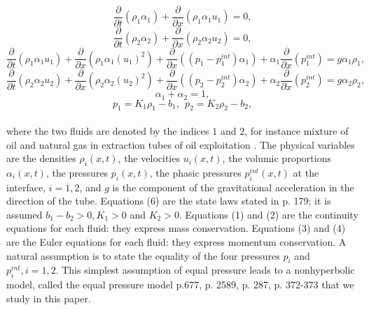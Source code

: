\documentclass[a4paper,12pt]{article}
\begin{document}
\begin{equation}\frac{\partial}{\partial t}(\rho_1 \alpha_1)+\frac{\partial}{\partial x}(\rho_1\alpha_1 u_1)=0,\end{equation}
\begin{equation}\frac{\partial}{\partial t}(\rho_2 \alpha_2)+\frac{\partial}{\partial x}(\rho_2\alpha_2 u_2)=0,\end{equation}
\begin{equation}\frac{\partial}{\partial t}(\rho_1 \alpha_1u_1)+\frac{\partial}{\partial x}(\rho_1\alpha_1( u_1)^2)+\frac{\partial}{\partial x}((p_1-p_1^{int})\alpha_1)+\alpha_1\frac{\partial}{\partial x}(p_1^{int})=g\alpha_1\rho_1,\end{equation}
\begin{equation}\frac{\partial}{\partial t}(\rho_2 \alpha_2u_2)+\frac{\partial}{\partial x}(\rho_2\alpha_2( u_2)^2)+\frac{\partial}{\partial x}((p_2-p_2^{int})\alpha_2)+\alpha_2\frac{\partial}{\partial x}(p_2^{int})=g\alpha_2\rho_2,\end{equation}
\begin{equation}\alpha_1+\alpha_2=1,\end{equation}
\begin{equation}p_1=K_1\rho_1-b_1, \ \ p_2=K_2\rho_2-b_2,\end{equation}
\\
where the two fluids are denoted by the indices $1$  and $2$, for instance mixture of oil and natural gas in extraction tubes of oil exploitation \cite{Avelar}. The physical variables are 
the densities $\rho_i(x,t)$, the velocities $u_i(x,t)$, the volumic proportions
$\alpha_i(x,t)$, the pressures
$p_i(x,t)$, the phasic pressures $p_i^{int}(x,t)$ at the interface, $i=1,2$, and
$g$ is the component of the gravitational acceleration in the direction of the tube.
Equations (6) are the state laws stated  in \cite{EvjeFlatten} p. 179; it is assumed $b_1-b_2>0, K_1>0$ and $ K_2>0$.
Equations (1) and (2) are the continuity equations for each fluid: they express mass conservation. Equations (3) and (4) are the Euler equations for each fluid: they express momentum conservation. A natural assumption is to state the equality of the four pressures $p_i$ and $  p_i^{int}, i=1,2$. This simplest assumption of equal pressure  leads to a nonhyperbolic model, called the equal pressure model  \cite{EvjeFjelde} p.677,  \cite{Munk} p. 2589, \cite{Toumi} p. 287, \cite{Wendroff} p. 372-373 that we study in this paper. \\
\end{document}
